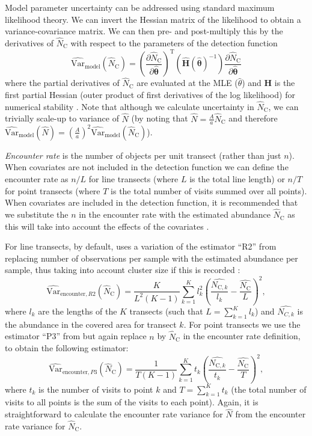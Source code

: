 \documentclass[article]{jss}
\begin{document}
Model parameter uncertainty can be addressed using standard maximum
likelihood theory. We can invert the Hessian matrix of the likelihood to
obtain a variance-covariance matrix. We can then pre- and post-multiply
this by the derivatives of \(\hat{N}_\text{C}\) with respect to the
parameters of the detection function \[
\widehat{\text{Var}}_\text{model}\left( \hat{N}_\text{C}\right) = \left(\frac{\partial \hat{N}_\text{C}}{\partial\hat{\boldsymbol{\theta}}}\right)^\text{T} \left(\hat{\mathbf{H}}(\hat{\boldsymbol{\theta}})^{-1} \right)\frac{\partial \hat{N}_\text{C}}{\partial\hat{\boldsymbol{\theta}}}
\] where the partial derivatives of \(\hat{N}_\text{C}\) are evaluated
at the MLE (\(\hat{\theta}\)) and \(\mathbf{H}\) is the first partial
Hessian (outer product of first derivatives of the log likelihood) for
numerical stability \citep[p 62]{Buckland:2001vm}. Note that although we
calculate uncertainty in \(\hat{N}_\text{C}\), we can trivially scale-up
to variance of \(\hat{N}\) (by noting that
\(\hat{N} = \frac{A}{a} \hat{N}_\text{C}\) and therefore
\(\widehat{\text{Var}}_\text{model}\left(\hat{N}\right) = \left( \frac{A}{a} \right)^2 \widehat{\text{Var}}_\text{model} \left(\hat{N}_\text{C} \right)\)).

\emph{Encounter rate} is the number of objects per unit transect (rather
than just \(n\)). When covariates are not included in the detection
function we can define the encounter rate as \(n/L\) for line transects
(where \(L\) is the total line length) or \(n/T\) for point transects
(where \(T\) is the total number of visits summed over all points). When
covariates are included in the detection function, it is recommended
that we substitute the \(n\) in the encounter rate with the estimated
abundance \(\hat{N}_\text{C}\) as this will take into account the
effects of the covariates \citep{Innes:2002ka}.

For line transects, by default,  uses a variation of the
estimator ``R2'' from \citet{Fewster:2009ku} replacing number of
observations per sample with the estimated abundance per sample, thus
taking into account cluster size if this is recorded
\citep{Innes:2002ka, Marques:2003vb}: \[
\widehat{\text{Var}}_{\text{encounter},R2}\left( \hat{N}_\text{C}\right) = \frac{K}{L^2(K-1)} \sum_{k=1}^{K} l_k^2 \left( \frac{\hat{N_{\text{C}, k}}}{l_k} - \frac{\hat{N_\text{C}}}{L}\right)^2,
\] where \(l_k\) are the lengths of the \(K\) transects (such that
\(L = \sum_{k=1}^K l_k\)) and \(\hat{N_{C,k}}\) is the abundance in the
covered area for transect \(k\). For point transects we use the
estimator ``P3'' from \citet{Fewster:2009ku} but again replace \(n\) by
\(\hat{N}_\text{C}\) in the encounter rate definition, to obtain the
following estimator: \[
\widehat{\text{Var}}_{\text{encounter},P3}\left( \hat{N}_\text{C}\right) = \frac{1}{T(K-1)} \sum_{k=1}^{K} t_k \left( \frac{\hat{N_{\text{C}, k}}}{t_k} - \frac{\hat{N_\text{C}}}{T}\right)^2,
\] where \(t_k\) is the number of visits to point \(k\) and
\(T = \sum_{k=1}^K t_k\) (the total number of visits to all points is
the sum of the visits to each point). Again, it is straightforward to
calculate the encounter rate variance for \(\hat{N}\) from the encounter
rate variance for \(\hat{N}_\text{C}\).
\end{document}
